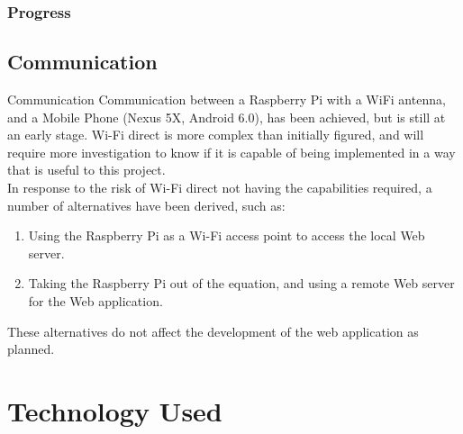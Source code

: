\documentclass{beamer}
\begin{document}
\begin{frame}
\frametitle{Progress}
\subsection{Communication}
\begin{block}{Communication}
Communication between a Raspberry Pi with a WiFi antenna, and a Mobile Phone (Nexus 5X, Android 6.0), has been achieved, but is still at an early stage. Wi-Fi direct is more complex than initially figured, and will require more investigation to know if it is capable of being implemented in a way that is useful to this project.\\
In response to the risk of Wi-Fi direct not having the capabilities required, a number of alternatives have been derived, such as:
\begin{enumerate}
	\item Using the Raspberry Pi as a Wi-Fi access point to access the local Web server.
	\item Taking the Raspberry Pi out of the equation, and using a remote Web server for the Web application.
\end{enumerate}
These alternatives do not affect the development of the web application as planned.
\end{block}
\end{frame}
\section{Technology Used} %

\end{document}
